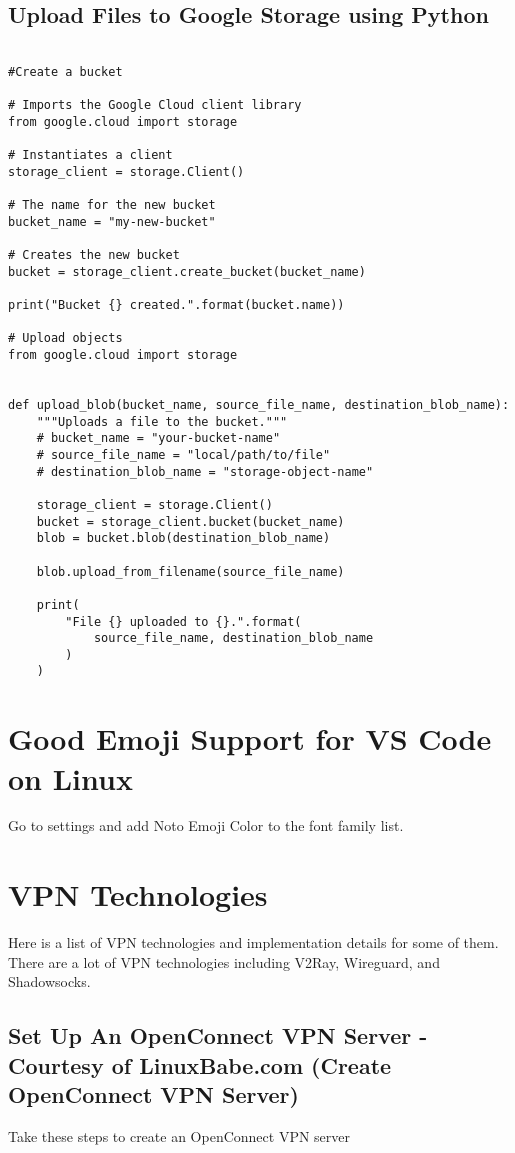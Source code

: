\documentclass{article}
\begin{document}
\subsection{Upload Files to Google Storage using Python}
\begin{verbatim}

#Create a bucket

# Imports the Google Cloud client library
from google.cloud import storage

# Instantiates a client
storage_client = storage.Client()

# The name for the new bucket
bucket_name = "my-new-bucket"

# Creates the new bucket
bucket = storage_client.create_bucket(bucket_name)

print("Bucket {} created.".format(bucket.name))

# Upload objects
from google.cloud import storage


def upload_blob(bucket_name, source_file_name, destination_blob_name):
    """Uploads a file to the bucket."""
    # bucket_name = "your-bucket-name"
    # source_file_name = "local/path/to/file"
    # destination_blob_name = "storage-object-name"

    storage_client = storage.Client()
    bucket = storage_client.bucket(bucket_name)
    blob = bucket.blob(destination_blob_name)

    blob.upload_from_filename(source_file_name)

    print(
        "File {} uploaded to {}.".format(
            source_file_name, destination_blob_name
        )
    )

\end{verbatim}


\section{Good Emoji Support for VS Code on Linux}
Go to settings and add Noto Emoji Color to the font family list. 


\section{VPN Technologies}

Here is a list of VPN technologies and implementation details for some of them. There are a lot of VPN technologies including V2Ray, Wireguard, and Shadowsocks. 
\subsection{Set Up An OpenConnect VPN Server - Courtesy of LinuxBabe.com (Create OpenConnect VPN Server)}
Take these steps to create an OpenConnect VPN server
\end{document}
